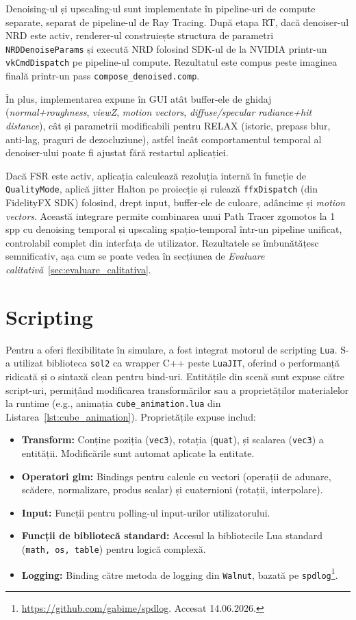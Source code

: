 \documentclass[12pt,a4paper]{report}
\numberwithin{equation}{section} %
\begin{document}
Denoising-ul și upscaling-ul sunt implementate în pipeline-uri de compute separate, separat de pipeline-ul de Ray Tracing.
După etapa RT, dacă denoiser-ul NRD este activ, renderer-ul construiește structura de parametri \texttt{NRDDenoiseParams} și execută NRD folosind SDK-ul de la NVIDIA printr-un \texttt{vkCmdDispatch} pe pipeline-ul compute.
Rezultatul este compus peste imaginea finală printr-un pass \texttt{compose\_denoised.comp}.

În plus, implementarea expune în GUI atât buffer-ele de ghidaj (\textit{normal+roughness}, \textit{viewZ}, \textit{motion vectors}, \textit{diffuse/specular radiance+hit distance}), cât și parametrii modificabili pentru RELAX (istoric, prepass blur, anti-lag, praguri de dezocluziune), astfel încât comportamentul temporal al denoiser-ului poate fi ajustat fără restartul aplicației.

Dacă FSR este activ, aplicația calculează rezoluția internă în funcție de \texttt{QualityMode}, aplică jitter Halton pe proiecție și rulează \texttt{ffxDispatch} (din FidelityFX SDK) folosind, drept input, buffer-ele de culoare, adâncime și \textit{motion vectors}.
Această integrare permite combinarea unui Path Tracer zgomotos la 1 spp cu denoising temporal și upscaling spațio-temporal într-un pipeline unificat, controlabil complet din interfața de utilizator.
Rezultatele se îmbunătățesc semnificativ, așa cum se poate vedea în secțiunea de \textit{Evaluare calitativă}~\ref{sec:evaluare_calitativa}.

\section{Scripting}\label{sec:scripting}

Pentru a oferi flexibilitate în simulare, a fost integrat motorul de scripting \texttt{Lua}.
S-a utilizat biblioteca \texttt{sol2} ca wrapper C++ peste \texttt{LuaJIT}, oferind o performanță ridicată și o sintaxă clean pentru bind-uri.
Entitățile din scenă sunt expuse către script-uri, permițând modificarea transformărilor sau a proprietăților materialelor la runtime (e.g., animația \texttt{cube\_animation.lua} din Listarea~\ref{lst:cube_animation}).
Proprietățile expuse includ:
\begin{itemize}
    \item \textbf{Transform:} Conține poziția (\texttt{vec3}), rotația (\texttt{quat}), și scalarea (\texttt{vec3}) a entității.
          Modificările sunt automat aplicate la entitate.
    \item \textbf{Operatori glm:} Bindings pentru calcule cu vectori (operații de adunare, scădere, normalizare, produs scalar) și cuaternioni (rotații, interpolare).
    \item \textbf{Input:} Funcții pentru polling-ul input-urilor utilizatorului.
    \item \textbf{Funcții de bibliotecă standard:} Accesul la bibliotecile Lua standard (\texttt{math, os, table}) pentru logică complexă.
    \item \textbf{Logging:} Binding către metoda de logging din \texttt{Walnut}, bazată pe \texttt{spdlog}\footnote{\url{https://github.com/gabime/spdlog}. Accesat 14.06.2026.}.
\end{itemize}
\end{document}
